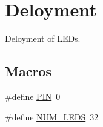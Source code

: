 \hypertarget{group__deployment}{}\section{Deloyment}
\label{group__deployment}


Deloyment of L\+E\+Ds.  


\subsection*{Macros}
\begin{DoxyCompactItemize}
\item 
\#define \hyperlink{group__deployment_gae1a27401b7fb01ccb9a82dbddbb54eea}{P\+IN}~0
\item 
\#define \hyperlink{group__deployment_ga4c4ae9a4146ce8d6a5debc90300d9abd}{N\+U\+M\+\_\+\+L\+E\+DS}~32
\end{DoxyCompactItemize}
